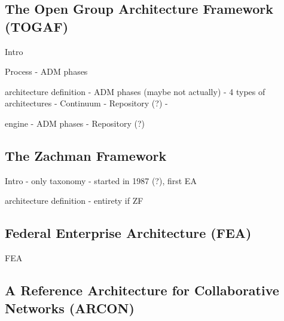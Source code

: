 % 
% 
% 

% 

\subsection{The Open Group Architecture Framework (TOGAF)}
Intro

Process
- ADM phases

architecture definition
- ADM phases (maybe not actually)
- 4 types of architectures
- Continuum
- Repository (?)
- 

engine
- ADM phases
- Repository (?)


\subsection{The Zachman Framework}
Intro
- only taxonomy
- started in 1987 (?), first EA

architecture definition
- entirety if ZF

\subsection{Federal Enterprise Architecture (FEA)}
FEA

\subsection{A Reference Architecture for Collaborative Networks (ARCON)}
